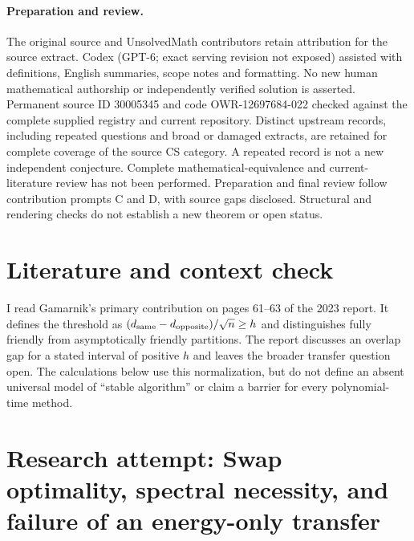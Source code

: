 \documentclass[11pt]{article}
\begin{document}
\paragraph{Preparation and review.}
The original source and UnsolvedMath contributors retain attribution for the source extract. Codex (GPT-6; exact serving revision not exposed) assisted with definitions, English summaries, scope notes and formatting. No new human mathematical authorship or independently verified solution is asserted. Permanent source ID 30005345 and code OWR-12697684-022 checked against the complete supplied registry and current repository. Distinct upstream records, including repeated questions and broad or damaged extracts, are retained for complete coverage of the source CS category. A repeated record is not a new independent conjecture. Complete mathematical-equivalence and current-literature review has not been performed. Preparation and final review follow contribution prompts C and D, with source gaps disclosed. Structural and rendering checks do not establish a new theorem or open status.
\label{end:30005345}

\section{Literature and context check}

I read Gamarnik's primary contribution on pages 61--63 of the 2023 report.
It defines the threshold as $(d_{\rm same}-d_{\rm opposite})/\sqrt n\geq h$
and distinguishes fully friendly from asymptotically friendly partitions.
The report discusses an overlap gap for a stated interval of positive $h$ and
leaves the broader transfer question open. The calculations below use this
normalization, but do not define an absent universal model of ``stable algorithm''
or claim a barrier for every polynomial-time method.

\section{Research attempt: Swap optimality, spectral necessity, and failure of an energy-only transfer}
\end{document}
